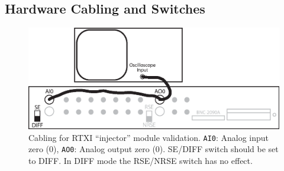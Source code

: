 \documentclass[12pt]{article}
\begin{document}
\subsection*{Hardware Cabling and Switches}

\begin{figure}[h]
  \centering
    \includegraphics[scale=0.75]{figures/rtxi-connector-backpanel.eps}
    \caption{Cabling for RTXI ``injector'' module validation. {\tt AI0}: Analog input zero (0), {\tt AO0}: Analog output zero (0). SE/DIFF switch should be set to DIFF. In DIFF mode the RSE/NRSE switch has no effect.}
  \label{fig:rtxi-inj}
\end{figure}
\end{document}
